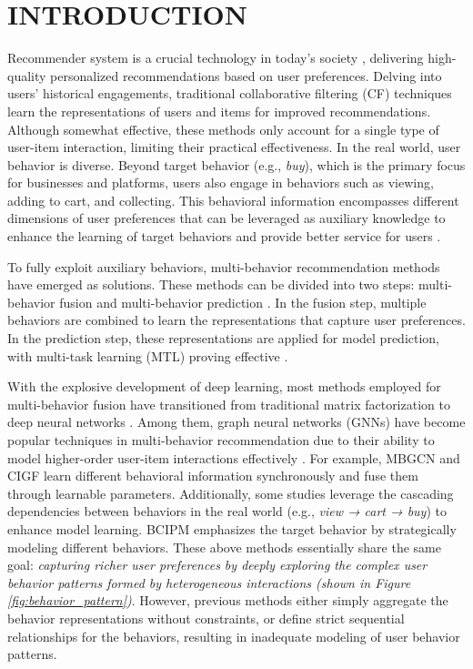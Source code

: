 \section{INTRODUCTION}
\label{intro}
Recommender system is a crucial technology in today's society \cite{meng2024coarse, wang2024future,li2024cdrnp,zhao2023task,dang2024augmenting}, delivering high-quality personalized recommendations based on user preferences. Delving into users’ historical engagements, traditional collaborative filtering (CF) techniques \cite{cfsurvey} learn the representations of users and items for improved recommendations. 
Although somewhat effective, these methods only account for a single type of user-item interaction, limiting their practical effectiveness. In the real world, user behavior is diverse. Beyond target behavior (e.g., \textit{buy}), which is the primary focus for businesses and platforms, users also engage in behaviors such as viewing, adding to cart, and collecting. This behavioral information encompasses different dimensions of user preferences that can be leveraged as auxiliary knowledge to enhance the learning of target behaviors and provide better service for users \cite{nmtr,matn,mbgcn}.

To fully exploit auxiliary behaviors, multi-behavior recommendation methods have emerged as solutions. These methods can be divided into two steps: multi-behavior fusion and multi-behavior prediction \cite{he2023survey, pkef}. In the fusion step, multiple behaviors are combined to learn the representations that capture user preferences. In the prediction step, these representations are applied for model prediction, with multi-task learning (MTL) proving effective \cite{huang2021recent}.

With the explosive development of deep learning, most methods employed for multi-behavior fusion have transitioned from traditional matrix factorization \cite{mf1,mf2,mf3} to deep neural networks \cite{matn,nmtr,dipn}. Among them, graph neural networks (GNNs) \cite{lightgcn,ngcf,lr-gccf,hpmr,ckml} have become popular techniques in multi-behavior recommendation due to their ability to model higher-order user-item interactions effectively \cite{khgt,ghcf,gnmr,pkef}. For example, MBGCN \cite{mbgcn} and CIGF \cite{cigf} learn different behavioral information synchronously and fuse them through learnable parameters. Additionally, some studies \cite{crgcn, mbcgcn, pkef} leverage the cascading dependencies between behaviors in the real world (e.g., \textit{view → cart → buy}) to enhance model learning. BCIPM \cite{bipn} emphasizes the target behavior by strategically modeling different behaviors. These above methods essentially share the same goal: \textit{capturing richer user preferences by deeply exploring the complex user behavior patterns formed by heterogeneous interactions (shown in Figure \ref{fig:behavior_pattern})}. However, previous methods either simply aggregate the behavior representations without constraints, or define strict sequential relationships for the behaviors, resulting in inadequate modeling of user behavior patterns.

